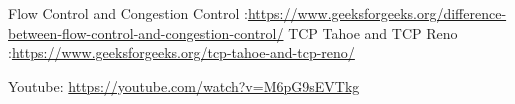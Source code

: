 \documentclass[11pt]{article}
\begin{document}
\begin{thebibliography}{1}
   Flow Control and Congestion Control :\url{https://www.geeksforgeeks.org/difference-between-flow-control-and-congestion-control/}
   TCP Tahoe and TCP Reno :\url{https://www.geeksforgeeks.org/tcp-tahoe-and-tcp-reno/}
  
   Youtube: \url{https://youtube.com/watch?v=M6pG9sEVTkg}
 
  

 
\end{thebibliography}
\end{document}
